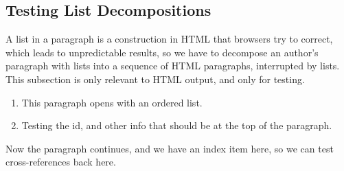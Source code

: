 \documentclass{amsart}
\theoremstyle{plain}%
\theoremstyle{definition}%
\theoremstyle{remark}%
\numberwithin{equation}{section}
\begin{document}
\subsection{Testing List Decompositions}\label{section-lists-9}%
A list in a paragraph is a construction in HTML that browsers try to correct, which leads to unpredictable results, so we have to decompose an author's paragraph with lists into a sequence of HTML paragraphs, interrupted by lists.  This subsection is only relevant to HTML output, and only for testing.%
\par
%
\begin{enumerate}
\item{}This paragraph opens with an ordered list.%
\item{}Testing the id, and other info that should be at the top of the paragraph.%
\end{enumerate}
Now the paragraph continues, and we have an index item here, so we can test cross-references back here.%
%
%
\typeout{************************************************}
\typeout{************************************************}
%
\end{document}
